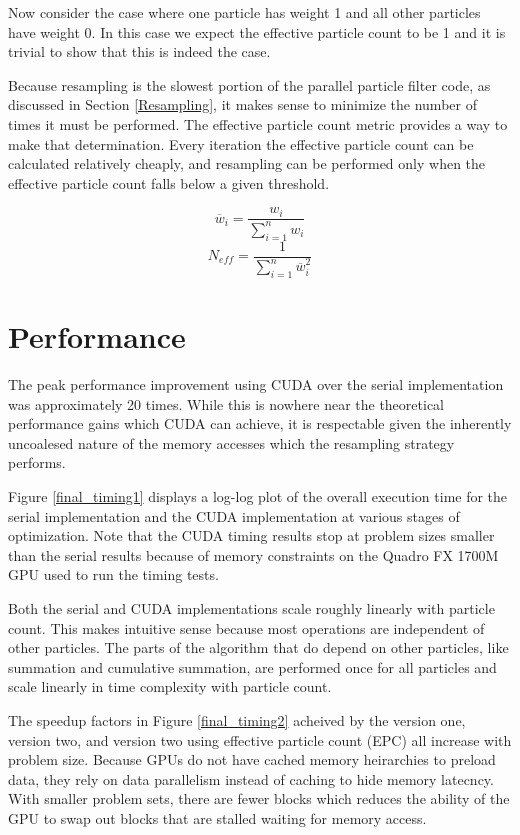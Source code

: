 \documentclass{article}
\begin{document}
Now consider the case where one particle has weight 1 and all other particles have weight 0. In this case we expect the effective particle count to be 1 and it is trivial to show that this is indeed the case.

Because resampling is the slowest portion of the parallel particle filter code, as discussed in Section \ref{Resampling}, it makes sense to minimize the number of times it must be performed. The effective particle count metric provides a way to make that determination. Every iteration the effective particle count can be calculated relatively cheaply, and resampling can be performed only when the effective particle count falls below a given threshold.

\[\overline{w}_{i} = \frac{w_{i}}{\sum_{i=1}^{n} w_{i}}\]
\begin{equation}\label{epc}
N_{eff} = \frac{1}{\sum_{i=1}^{n} \overline{w}_{i}^2}
\end{equation}

\section{Performance}
The peak performance improvement using CUDA over the serial implementation was approximately 20 times. While this is nowhere near the theoretical performance gains which CUDA can achieve, it is respectable given the inherently uncoalesed nature of the memory accesses which the resampling strategy performs.

Figure \ref{final_timing1} displays a log-log plot of the overall execution time for the serial implementation and the CUDA implementation at various stages of optimization. Note that the CUDA timing results stop at problem sizes smaller than the serial results because of memory constraints on the Quadro FX 1700M GPU used to run the timing tests.

Both the serial and CUDA implementations scale roughly linearly with particle count. This makes intuitive sense because most operations are independent of other particles. The parts of the algorithm that do depend on other particles, like summation and cumulative summation, are performed once for all particles and scale linearly in time complexity with particle count.

The speedup factors in Figure \ref{final_timing2} acheived by the version one, version two, and version two using effective particle count (EPC) all increase with problem size. Because GPUs do not have cached memory heirarchies to preload data, they rely on data parallelism instead of caching to hide memory latecncy. With smaller problem sets, there are fewer blocks which reduces the ability of the GPU to swap out blocks that are stalled waiting for memory access.
\end{document}
